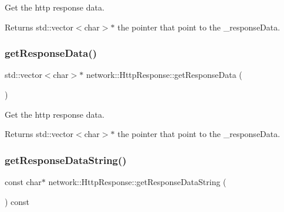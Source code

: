 Get the http response data. \begin{DoxyReturn}{Returns}
std\+::vector$<$char$>$$\ast$ the pointer that point to the \+\_\+response\+Data. 
\end{DoxyReturn}
\mbox{\label{classnetwork_1_1HttpResponse_a476f45e6514da88f0ce5ba462dc2235a}} 
\subsubsection{\texorpdfstring{get\+Response\+Data()}{getResponseData()}\hspace{0.1cm}{\footnotesize\ttfamily [2/2]}}
{\footnotesize\ttfamily std\+::vector$<$char$>$$\ast$ network\+::\+Http\+Response\+::get\+Response\+Data (\begin{DoxyParamCaption}{ }\end{DoxyParamCaption})\hspace{0.3cm}{\ttfamily [inline]}}

Get the http response data. \begin{DoxyReturn}{Returns}
std\+::vector$<$char$>$$\ast$ the pointer that point to the \+\_\+response\+Data. 
\end{DoxyReturn}
\mbox{\label{classnetwork_1_1HttpResponse_a6526a4a5c1247a20ab171fa246218b85}} 
\subsubsection{\texorpdfstring{get\+Response\+Data\+String()}{getResponseDataString()}\hspace{0.1cm}{\footnotesize\ttfamily [1/2]}}
{\footnotesize\ttfamily const char$\ast$ network\+::\+Http\+Response\+::get\+Response\+Data\+String (\begin{DoxyParamCaption}{ }\end{DoxyParamCaption}) const\hspace{0.3cm}{\ttfamily [inline]}}

